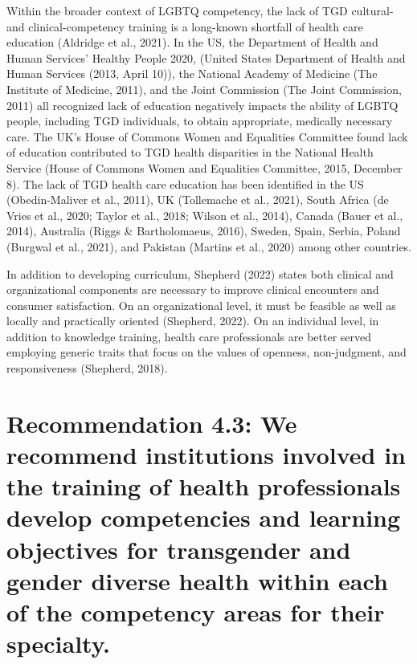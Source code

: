\documentclass[
]{book}
\begin{document}
Within the broader context of LGBTQ competency, the lack of TGD cultural- and
clinical-competency training is a long-known
shortfall of health care education (Aldridge et al.,
2021). In the US, the Department of Health and
Human Services' Healthy People 2020, (United
States Department of Health and Human Services
(2013, April 10)), the National Academy of
Medicine (The Institute of Medicine, 2011), and
the Joint Commission (The Joint Commission,
2011) all recognized lack of education negatively
impacts the ability of LGBTQ people, including
TGD individuals, to obtain appropriate, medically
necessary care. The UK's House of Commons
Women and Equalities Committee found lack of
education contributed to TGD health disparities
in the National Health Service (House of
Commons Women and Equalities Committee,
2015, December 8). The lack of TGD health care
education has been identified in the US
(Obedin-Maliver et al., 2011), UK (Tollemache
et al., 2021), South Africa (de Vries et al., 2020;
Taylor et al., 2018; Wilson et al., 2014), Canada
(Bauer et al., 2014), Australia (Riggs \&
Bartholomaeus, 2016), Sweden, Spain, Serbia,
Poland (Burgwal et al., 2021), and Pakistan
(Martins et al., 2020) among other countries.

In addition to developing curriculum, Shepherd
(2022) states both clinical and organizational
components are necessary to improve clinical
encounters and consumer satisfaction. On an
organizational level, it must be feasible as well
as locally and practically oriented (Shepherd,
2022). On an individual level, in addition to
knowledge training, health care professionals are
better served employing generic traits that focus
on the values of openness, non-judgment, and
responsiveness (Shepherd, 2018).

\hypertarget{recommendation-4.3-we-recommend-institutions-involved-in-the-training-of-health-professionals-develop-competencies-and-learning-objectives-for-transgender-and-gender-diverse-health-within-each-of-the-competency-areas-for-their-specialty.}{%
\section*{Recommendation 4.3: We recommend institutions involved in the training of health professionals develop competencies and learning objectives for transgender and gender diverse health within each of the competency areas for their specialty.}\label{recommendation-4.3-we-recommend-institutions-involved-in-the-training-of-health-professionals-develop-competencies-and-learning-objectives-for-transgender-and-gender-diverse-health-within-each-of-the-competency-areas-for-their-specialty.}}
\end{document}
